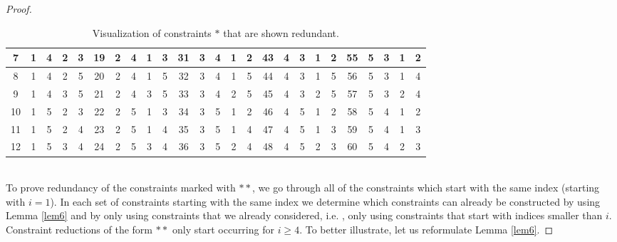 \begin{proof}
\begin{table}[h!]
{\begin{tabular}{||c | c c c c||c | c c c c||c | c c c c||c | c c c c||c | c c c c||}
			\hline
			7 & 1 & 4 & 2 & 3 & 19 & 2 & 4 & 1 & 3 & 31 & 3 & 4 & 1 & 2 & 43 & 4 & 3 & 1 & 2 & 55 & 5 & 3 & 1 & 2 \\ 
			\hline
			8 & 1 & 4 & 2 & 5 & 20 & 2 & 4 & 1 & 5 & 32 & 3 & 4 & 1 & 5 & 44 & 4 & 3 & 1 & 5 & 56 & 5 & 3 & 1 & 4 \\ 
			\hline
			9 & \cellcolor{red!75}1 & \cellcolor{red!75}4 & \cellcolor{red!75}3 & \cellcolor{red!75}5 & 21 & \cellcolor{red!75}2 & \cellcolor{red!75}4 & \cellcolor{red!75}3 & \cellcolor{red!75}5 & 33 & \cellcolor{red!75}3 & \cellcolor{red!75}4 & \cellcolor{red!75}2 & \cellcolor{red!75}5 & 45 & \cellcolor{red!75}4 & \cellcolor{red!75}3 & \cellcolor{red!75}2 & \cellcolor{red!75}5 & 57 & \cellcolor{red!75}5 & \cellcolor{red!75}3 & \cellcolor{red!75}2 & \cellcolor{red!75}4 \\ 
			\hline
			10 & 1 & 5 & 2 & 3 & 22 & 2 & 5 & 1 & 3 & 34 & 3 & 5 & 1 & 2 & 46 & 4 & 5 & 1 & 2 & 58 & 5 & 4 & 1 & 2 \\ 
			\hline
			11 & 1 & 5 & 2 & 4 & 23 & 2 & 5 & 1 & 4 & 35 & 3 & 5 & 1 & 4 & 47 & 4 & 5 & 1 & 3 & 59 & 5 & 4 & 1 & 3 \\ 
			\hline
			12 & \cellcolor{red!75}1 & \cellcolor{red!75}5 & \cellcolor{red!75}3 & \cellcolor{red!75}4 & 24 & \cellcolor{red!75}2 & \cellcolor{red!75}5 & \cellcolor{red!75}3 & \cellcolor{red!75}4 & 36 & \cellcolor{red!75}3 & \cellcolor{red!75}5 & \cellcolor{red!75}2 & \cellcolor{red!75}4 & 48 & \cellcolor{red!75}4 & \cellcolor{red!75}5 & \cellcolor{red!75}2 & \cellcolor{red!75}3 & 60 & \cellcolor{red!75}5 & \cellcolor{red!75}4 & \cellcolor{red!75}2 & \cellcolor{red!75}3 \\ 
			\hline
		\end{tabular}%
	}
	\caption{Visualization of constraints $*$ that are shown redundant.}
\end{table}

 \\

To prove redundancy of the constraints marked with $**$, we go through all of the constraints which start with the same index (starting with $i=1$). In each set of constraints starting with the same index we determine which constraints can already be constructed by using Lemma \ref{lem6} and by only using constraints that we already considered, i.e. , only using constraints that start with indices smaller than $i$. Constraint reductions of the form $**$ only start occurring for $i \geq 4$. To better illustrate, let us reformulate Lemma \ref{lem6}.


\end{proof}
